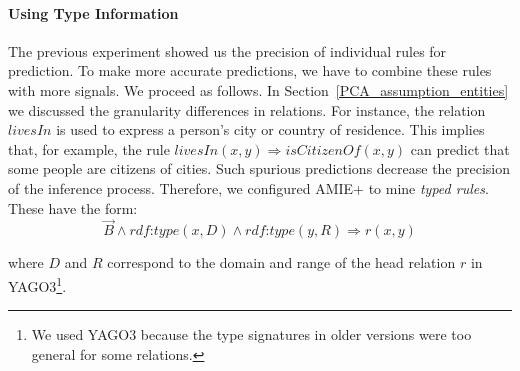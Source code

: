 \paragraph{Using Type Information}
The previous experiment showed us the precision of individual rules for prediction. 
To make more accurate predictions, we have to combine these rules with more signals. 
We proceed as follows. In Section~\ref{PCA_assumption_entities} we discussed the granularity
differences in relations. For instance, the relation $livesIn$ is used to express a person's city or country of residence. 
This implies that, for example, the rule 
$livesIn(x, y) \Rightarrow isCitizenOf(x, y)$ can predict that some people are citizens of cities. Such spurious predictions decrease the precision
of the inference process. Therefore, we configured AMIE+ to mine \emph{typed rules}. These have the form:
\[
 \vec{B} \wedge \textit{rdf:type}(x, D) \wedge \textit{rdf:type}(y, R) \Rightarrow r(x, y)
\]

\noindent where $D$ and $R$ correspond to the domain and range of the head relation $r$ in YAGO3\footnote{We used YAGO3 because the type signatures in older versions were too general for some relations.}.

